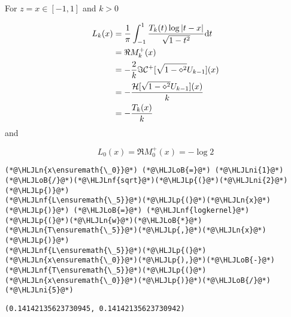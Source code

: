 \documentclass[12pt,a4paper]{article}
\newcommand{\HLJLn}[1]{#1}
\newcommand{\HLJLnf}[1]{\textcolor[RGB]{66,102,213}{#1}}
\newcommand{\HLJLni}[1]{\textcolor[RGB]{59,151,46}{#1}}
\newcommand{\HLJLoB}[1]{\textcolor[RGB]{102,102,102}{\textbf{#1}}}
\newcommand{\HLJLp}[1]{#1}
\def\D{ {\rm d} }
\def\CC{ {\cal C} }
\def\HH{ {\cal H} }
\def\dt{\D t}
\begin{document}
For $z = x \in [-1, 1]$ and $k > 0$


\begin{align*}
L_k(x) & = {1 \over \pi}\int_{-1}^{1} {T_k(t) \log\vert t - x \vert \over  \sqrt{1-t^2}} \dt \\
 & =\Re M_k^{+}(x)  \\
 & = - {2\over k} \Im \CC^{+}[\sqrt{1-\diamond^2} U_{k-1}](x)\\
& = -{\HH [\sqrt{1-\diamond^2} U_{k-1}](x)\over k} \\
& = - {T_k(x)\over k}
\end{align*}
and

\[
L_0(x) = \Re M_0^{+}(x) = -\log 2
\]

\begin{lstlisting}
(*@\HLJLn{x\ensuremath{\_0}}@*) (*@\HLJLoB{=}@*) (*@\HLJLni{1}@*)(*@\HLJLoB{/}@*)(*@\HLJLnf{sqrt}@*)(*@\HLJLp{(}@*)(*@\HLJLni{2}@*)(*@\HLJLp{)}@*)
(*@\HLJLnf{L\ensuremath{\_5}}@*)(*@\HLJLp{(}@*)(*@\HLJLn{x}@*)(*@\HLJLp{)}@*) (*@\HLJLoB{=}@*) (*@\HLJLnf{logkernel}@*)(*@\HLJLp{(}@*)(*@\HLJLn{w}@*)(*@\HLJLoB{*}@*)(*@\HLJLn{T\ensuremath{\_5}}@*)(*@\HLJLp{,}@*)(*@\HLJLn{x}@*)(*@\HLJLp{)}@*)
(*@\HLJLnf{L\ensuremath{\_5}}@*)(*@\HLJLp{(}@*)(*@\HLJLn{x\ensuremath{\_0}}@*)(*@\HLJLp{),}@*)(*@\HLJLoB{-}@*)(*@\HLJLnf{T\ensuremath{\_5}}@*)(*@\HLJLp{(}@*)(*@\HLJLn{x\ensuremath{\_0}}@*)(*@\HLJLp{)}@*)(*@\HLJLoB{/}@*)(*@\HLJLni{5}@*)
\end{lstlisting}

\begin{lstlisting}
(0.14142135623730945, 0.14142135623730942)
\end{lstlisting}
\end{document}
